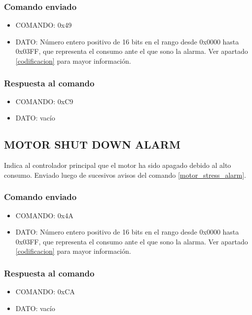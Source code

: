 \documentclass[a4paper,10pt]{article}
\begin{document}
\subsubsection*{Comando enviado}

\begin{itemize}
	\item{COMANDO:} 0x49
	\item{DATO:} N\'umero entero positivo de 16 bits en el rango desde 0x0000 hasta 0x03FF, que representa el consumo ante el que sono la alarma.
		Ver apartado \ref{codificacion} para mayor informaci\'on.
\end{itemize}

\subsubsection*{Respuesta al comando}

\begin{itemize}
	\item{COMANDO:} 0xC9
	\item{DATO:} vac\'io
\end{itemize}

\subsection{MOTOR SHUT DOWN ALARM}
\label{motor_shutdown_alarm}

Indica al controlador principal que el motor ha sido apagado debido al alto consumo.
Enviado luego de sucesivos avisos del comando \ref{motor_stress_alarm}.

\subsubsection*{Comando enviado}

\begin{itemize}
	\item{COMANDO:} 0x4A
	\item{DATO:} N\'umero entero positivo de 16 bits en el rango desde 0x0000 hasta 0x03FF, que representa el consumo ante el que sono la alarma.
		Ver apartado \ref{codificacion} para mayor informaci\'on.
\end{itemize}

\subsubsection*{Respuesta al comando}

\begin{itemize}
	\item{COMANDO:} 0xCA
	\item{DATO:} vac\'io
\end{itemize}
\end{document}
